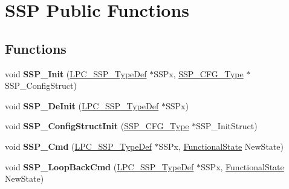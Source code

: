 \hypertarget{group___s_s_p___public___functions}{\section{\-S\-S\-P \-Public \-Functions}
\label{group___s_s_p___public___functions}
}
\subsection*{\-Functions}
\begin{DoxyCompactItemize}
\item 
\hypertarget{group___s_s_p___public___functions_ga27795785a9e9370ea2c17d65d3e2fcd6}{void {\bfseries \-S\-S\-P\-\_\-\-Init} (\hyperlink{struct_l_p_c___s_s_p___type_def}{\-L\-P\-C\-\_\-\-S\-S\-P\-\_\-\-Type\-Def} $\ast$\-S\-S\-Px, \hyperlink{struct_s_s_p___c_f_g___type}{\-S\-S\-P\-\_\-\-C\-F\-G\-\_\-\-Type} $\ast$\-S\-S\-P\-\_\-\-Config\-Struct)}\label{group___s_s_p___public___functions_ga27795785a9e9370ea2c17d65d3e2fcd6}

\item 
\hypertarget{group___s_s_p___public___functions_ga7075ef3eb4f2714ade40f59eec228fb2}{void {\bfseries \-S\-S\-P\-\_\-\-De\-Init} (\hyperlink{struct_l_p_c___s_s_p___type_def}{\-L\-P\-C\-\_\-\-S\-S\-P\-\_\-\-Type\-Def} $\ast$\-S\-S\-Px)}\label{group___s_s_p___public___functions_ga7075ef3eb4f2714ade40f59eec228fb2}

\item 
\hypertarget{group___s_s_p___public___functions_ga99c27d390c1b6e12864b1fd459ff7f69}{void {\bfseries \-S\-S\-P\-\_\-\-Config\-Struct\-Init} (\hyperlink{struct_s_s_p___c_f_g___type}{\-S\-S\-P\-\_\-\-C\-F\-G\-\_\-\-Type} $\ast$\-S\-S\-P\-\_\-\-Init\-Struct)}\label{group___s_s_p___public___functions_ga99c27d390c1b6e12864b1fd459ff7f69}

\item 
\hypertarget{group___s_s_p___public___functions_ga64abe237d8715fa5641936db6ebc1165}{void {\bfseries \-S\-S\-P\-\_\-\-Cmd} (\hyperlink{struct_l_p_c___s_s_p___type_def}{\-L\-P\-C\-\_\-\-S\-S\-P\-\_\-\-Type\-Def} $\ast$\-S\-S\-Px, \hyperlink{group___l_p_c___types___public___types_gac9a7e9a35d2513ec15c3b537aaa4fba1}{\-Functional\-State} \-New\-State)}\label{group___s_s_p___public___functions_ga64abe237d8715fa5641936db6ebc1165}

\item 
\hypertarget{group___s_s_p___public___functions_ga9f13c0eaf5f3f561d094f76aafdd3eed}{void {\bfseries \-S\-S\-P\-\_\-\-Loop\-Back\-Cmd} (\hyperlink{struct_l_p_c___s_s_p___type_def}{\-L\-P\-C\-\_\-\-S\-S\-P\-\_\-\-Type\-Def} $\ast$\-S\-S\-Px, \hyperlink{group___l_p_c___types___public___types_gac9a7e9a35d2513ec15c3b537aaa4fba1}{\-Functional\-State} \-New\-State)}\label{group___s_s_p___public___functions_ga9f13c0eaf5f3f561d094f76aafdd3eed}


\end{DoxyCompactItemize}
